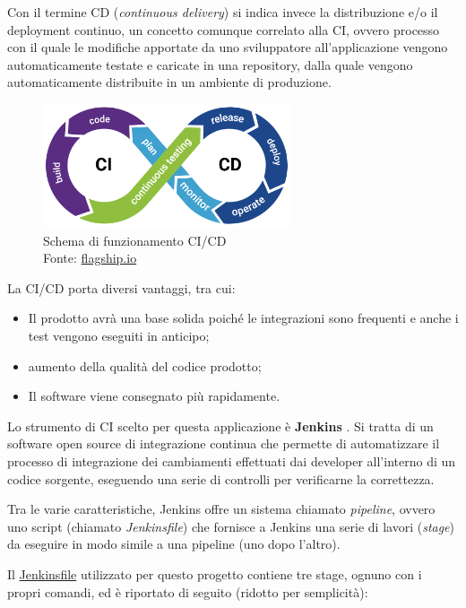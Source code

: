 Con il termine CD (\textit{continuous delivery}) si indica invece la distribuzione e/o il deployment continuo, un concetto comunque correlato alla CI, ovvero processo con il quale le modifiche apportate da uno sviluppatore all'applicazione vengono automaticamente testate e caricate in una repository, dalla quale vengono automaticamente distribuite in un ambiente di produzione. \cite{cicd}

\begin{figure}[H]
\centering
\includegraphics[width=0.65\textwidth,height=\textheight,keepaspectratio]{img/ci}
\caption{Schema di funzionamento CI/CD\\Fonte: \url{flagship.io}}
\label{fig:cicd}
\end{figure}

La CI/CD porta diversi vantaggi, tra cui:
\begin{itemize}
  \item Il prodotto avrà una base solida poiché le integrazioni sono frequenti e anche i test vengono eseguiti in anticipo;
  \item aumento della qualità del codice prodotto;
  \item Il software viene consegnato più rapidamente.
\end{itemize}

Lo strumento di CI scelto per questa applicazione è \textbf{Jenkins} \cite{jenkins}. Si tratta di un software open source di integrazione continua che permette di automatizzare il processo di integrazione dei cambiamenti effettuati dai developer all'interno di un codice sorgente, eseguendo una serie di controlli per verificarne la correttezza.

Tra le varie caratteristiche, Jenkins offre un sistema chiamato \textit{pipeline}, ovvero uno script (chiamato \textit{Jenkinsfile}) che fornisce a Jenkins una serie di lavori (\textit{stage}) da eseguire in modo simile a una pipeline (uno dopo l'altro).

Il \url{Jenkinsfile} utilizzato per questo progetto contiene tre stage, ognuno con i propri comandi, ed è riportato di seguito (ridotto per semplicità):

